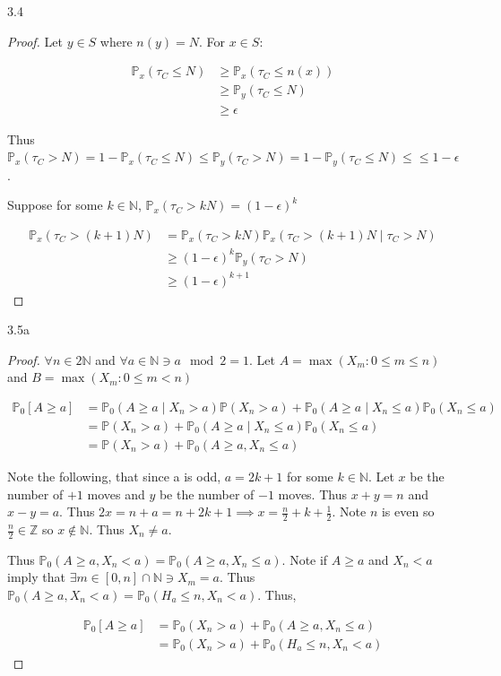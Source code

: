 \documentclass{article}
\newcommand{\PR}{\mathbb{P}}
\newcommand{\Z}{\mathbb{Z}}
\newcommand{\N}{\mathbb{N}}
\begin{document}
\begin{PROB}{3.4}\label{Problem 3.4.}
\end{PROB}
\begin{proof}
    Let $y \in S$ where $n(y) = N$.   
    For $x \in S$: 
    
    \begin{align*}
        \PR_x(\tau_C \leq N) &\geq \PR_x(\tau_C \leq n(x)) \\
        &\geq \PR_y(\tau_C \leq N) \\
        &\geq \epsilon
    \end{align*}

    Thus $\PR_x(\tau_C > N) = 1 - \PR_x(\tau_C \leq N) \leq \PR_y(\tau_C > N) = 1 - \PR_y(\tau_C \leq N) \leq \leq 1 - \epsilon$.
    
    Suppose for some $k \in \N$, $\PR_x(\tau_C > kN) = (1- \epsilon)^k$
    
    \begin{align*}
        \PR_x(\tau_C > (k + 1)N) &= \PR_x(\tau_C > kN) \PR_x(\tau_C > (k + 1)N \mid \tau_C > N) \\
        &\geq (1 - \epsilon)^k \PR_y(\tau_C > N) \\
        &\geq (1 - \epsilon)^{k + 1}
    \end{align*}
\end{proof}

\bigskip

\begin{PROB}{3.5a}\label{Problem 3.5a.}
\end{PROB}
\begin{proof}
    $\forall n \in 2\N$ and $\forall a \in \N \ni a \mod 2 = 1$. Let $A = \max(X_m : 0 \leq m \leq n)$ and $B = \max(X_m : 0 \leq m < n)$  
    
    \begin{align*}
        \PR_0[A \geq a ] &= \PR_0(A \geq a \mid X_n > a) \PR(X_n > a) + \PR_0(A \geq a \mid X_n \leq a)\PR_0(X_n \leq a)\\
        &=  \PR(X_n > a) + \PR_0(A \geq a \mid X_n \leq a)\PR_0(X_n \leq a) \\
        &= \PR(X_n > a) + \PR_0(A \geq a , X_n \leq a)
    \end{align*}

    Note the following, that since a is odd, $a = 2k + 1$ for some $k \in \N$. Let $x$ be the number of $+1$ moves and $y$ be the number of $-1$ moves. Thus $x + y= n$ and $x - y = a$. Thus $2x = n + a = n + 2k + 1 \implies x = \frac{n}{2} + k + \frac{1}{2}$. Note $n$ is even so $\frac{n}{2} \in \Z$ so $x \not \in \N$. Thus $X_n \neq a$. 
    
    Thus $\PR_0(A \geq a, X_n < a) = \PR_0(A \geq a , X_n \leq a)$. Note if $A \geq a$ and $X_n < a$ imply that $\exists m \in [0, n] \cap \N \ni X_m = a$. Thus $\PR_0(A \geq a, X_n < a) = \PR_0(H_a \leq n, X_n < a)$. Thus,
    
    \begin{align*}
        \PR_0[A \geq a ] &= \PR_0(X_n > a) + \PR_0(A \geq a , X_n \leq a) \\
        &= \PR_0(X_n > a) + \PR_0(H_a \leq n, X_n < a)
    \end{align*}
\end{proof}
\end{document}
